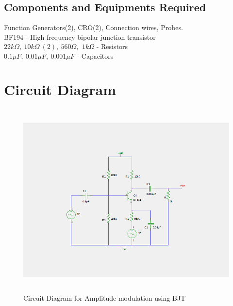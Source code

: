 \documentclass{book}
\begin{document}
\subsection*{Components and Equipments Required}
Function Generators(2), CRO(2), Connection wires, Probes.
\\BF194 - High frequency bipolar junction transistor
\\ $22k\Omega,\  10k\Omega\ (2),\ 560\Omega,\,\ 1k\Omega $ - Resistors
\\ $ 0.1\mu F,\ 0.01\mu F, \ 0.001\mu F $ - Capacitors
\\ 
\section*{Circuit Diagram}
\begin{figure}[h]
\includegraphics[width=15cm, height=10cm, trim=5cm 3.5cm 4cm 3.5cm, clip=true]{AM.png}
\caption{Circuit Diagram for Amplitude modulation using BJT}

\end{figure}
\end{document}
